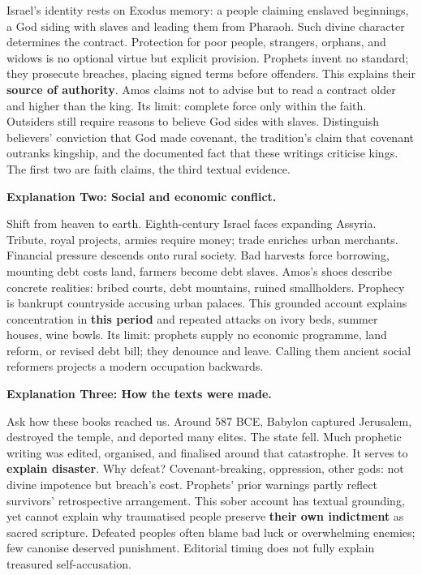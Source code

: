 Israel's identity rests on Exodus memory: a people claiming enslaved beginnings, a God siding with slaves and leading them from Pharaoh. Such divine character determines the contract. Protection for poor people, strangers, orphans, and widows is no optional virtue but explicit provision. Prophets invent no standard; they prosecute breaches, placing signed terms before offenders. This explains their \textbf{source of authority}. Amos claims not to advise but to read a contract older and higher than the king. Its limit: complete force only within the faith. Outsiders still require reasons to believe God sides with slaves. Distinguish believers' conviction that God made covenant, the tradition's claim that covenant outranks kingship, and the documented fact that these writings criticise kings. The first two are faith claims, the third textual evidence.

\textbf{Explanation Two: Social and economic conflict.}

Shift from heaven to earth. Eighth-century Israel faces expanding Assyria. Tribute, royal projects, armies require money; trade enriches urban merchants. Financial pressure descends onto rural society. Bad harvests force borrowing, mounting debt costs land, farmers become debt slaves. Amos's shoes describe concrete realities: bribed courts, debt mountains, ruined smallholders. Prophecy is bankrupt countryside accusing urban palaces. This grounded account explains concentration in \textbf{this period} and repeated attacks on ivory beds, summer houses, wine bowls. Its limit: prophets supply no economic programme, land reform, or revised debt bill; they denounce and leave. Calling them ancient social reformers projects a modern occupation backwards.

\textbf{Explanation Three: How the texts were made.}

Ask how these books reached us. Around 587 BCE, Babylon captured Jerusalem, destroyed the temple, and deported many elites. The state fell. Much prophetic writing was edited, organised, and finalised around that catastrophe. It serves to \textbf{explain disaster}. Why defeat? Covenant-breaking, oppression, other gods: not divine impotence but breach's cost. Prophets' prior warnings partly reflect survivors' retrospective arrangement. This sober account has textual grounding, yet cannot explain why traumatised people preserve \textbf{their own indictment} as sacred scripture. Defeated peoples often blame bad luck or overwhelming enemies; few canonise deserved punishment. Editorial timing does not fully explain treasured self-accusation.

